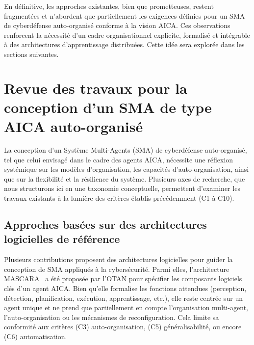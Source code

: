 \documentclass[ twoside,openright,titlepage,numbers=noenddot,headinclude,%
                footinclude=true,cleardoublepage=empty,abstractoff, %
                BCOR=5mm,paper=a4,fontsize=11pt,%
                french,american,%
                ]{scrreprt}
\begin{document}
En définitive, les approches existantes, bien que prometteuses, restent fragmentées et n'abordent que partiellement les exigences définies pour un SMA de cyberdéfense auto-organisé conforme à la vision AICA. Ces observations renforcent la nécessité d'un cadre organisationnel explicite, formalisé et intégrable à des architectures d'apprentissage distribuées. Cette idée sera explorée dans les sections suivantes.

\section{Revue des travaux pour la conception d'un SMA de type AICA auto-organisé}\label{sec:sma-conception-aica}

La conception d'un Système Multi-Agents (SMA) de cyberdéfense auto-organisé, tel que celui envisagé dans le cadre des agents AICA, nécessite une réflexion systémique sur les modèles d'organisation, les capacités d'auto-organisation, ainsi que sur la flexibilité et la résilience du système. Plusieurs axes de recherche, que nous structurons ici en une taxonomie conceptuelle, permettent d'examiner les travaux existants à la lumière des critères établis précédemment (C1 à C10).

\subsection*{Approches basées sur des architectures logicielles de référence}

Plusieurs contributions proposent des architectures logicielles pour guider la conception de SMA appliqués à la cybersécurité. Parmi elles, l'architecture MASCARA~\cite{mascara2020} a été proposée par l'OTAN pour spécifier les composants logiciels clés d'un agent AICA. Bien qu'elle formalise les fonctions attendues (perception, détection, planification, exécution, apprentissage, etc.), elle reste centrée sur un agent unique et ne prend que partiellement en compte l'organisation multi-agent, l'auto-organisation ou les mécanismes de reconfiguration. Cela limite sa conformité aux critères (C3) auto-organisation, (C5) généralisabilité, ou encore (C6) automatisation.
\end{document}
